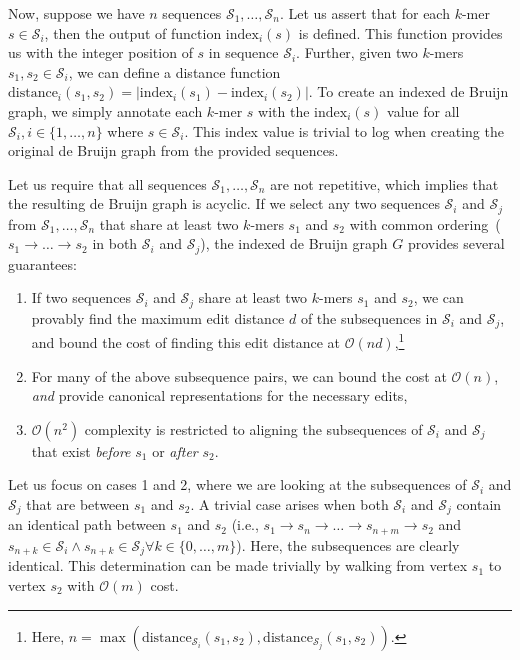 \documentclass{bioinfo}
\begin{document}
\begin{methods}
Now, suppose we have $n$ sequences $\mathcal{S}_1, \dots, \mathcal{S}_n$. Let us assert that for each
$k$-mer $s \in \mathcal{S}_i$, then the output of function $\text{index}_i(s)$ is defined. This function
provides us with the integer position of $s$ in sequence $\mathcal{S}_i$. Further, given two $k$-mers
$s_1, s_2 \in \mathcal{S}_i$, we can define a distance function
$\text{distance}_i(s_1, s_2) = | \text{index}_i(s_1) - \text{index}_i(s_2) |$. To create an indexed
de Bruijn graph, we simply annotate each $k$-mer $s$ with the $\text{index}_i(s)$ value for all
$\mathcal{S}_i, i \in \{1, \dots, n\}$ where $s \in \mathcal{S}_i$. This index value is trivial to log when
creating the original de Bruijn graph from the provided sequences.

Let us require that all sequences $\mathcal{S}_1, \dots, \mathcal{S}_n$ are not repetitive, which implies
that the resulting de Bruijn graph is acyclic. If we select any two sequences $\mathcal{S}_i$ and
$\mathcal{S}_j$ from $\mathcal{S}_1, \dots, \mathcal{S}_n$ that share at least two $k$-mers $s_1$ and
$s_2$ with common ordering~($s_1 \rightarrow \dots \rightarrow s_2$ in both $\mathcal{S}_i$ and
$\mathcal{S}_j$), the indexed de Bruijn graph $G$ provides several guarantees:

\begin{enumerate}
\item If two sequences $\mathcal{S}_i$ and $\mathcal{S}_j$ share at least two $k$-mers $s_1$ and
$s_2$, we can provably find the maximum edit distance $d$ of the subsequences in $\mathcal{S}_i$ and
$\mathcal{S}_j$, and bound the cost of finding this edit distance at $\mathcal{O}(nd)$,\footnote{Here,
$n = \max(\text{distance}_{\mathcal{S}_i}(s_1, s_2), \text{distance}_{\mathcal{S}_j}(s_1, s_2))$.}
\item For many of the above subsequence pairs, we can bound the cost at $\mathcal{O}(n)$, \emph{and}
provide canonical representations for the necessary edits,
\item $\mathcal{O}(n^2)$ complexity is restricted to aligning the subsequences of $\mathcal{S}_i$ and
$\mathcal{S}_j$ that exist \emph{before} $s_1$ or \emph{after} $s_2$.
\end{enumerate}

Let us focus on cases 1 and 2, where we are looking at the subsequences of $\mathcal{S}_i$ and
$\mathcal{S}_j$ that are between $s_1$ and $s_2$. A trivial case arises when both $\mathcal{S}_i$ and
$\mathcal{S}_j$ contain an identical path between $s_1$ and $s_2$ (i.e.,
$s_1 \rightarrow s_n \rightarrow \dots \rightarrow s_{n + m} \rightarrow s_2$ and
$s_{n + k} \in \mathcal{S}_i \wedge s_{n + k} \in \mathcal{S}_j \forall k \in \{0, \dots , m\}$). Here, the
subsequences are clearly identical. This determination can be made trivially by walking from vertex $s_1$
to vertex $s_2$ with $\mathcal{O}(m)$ cost.


\end{methods}
\end{document}
